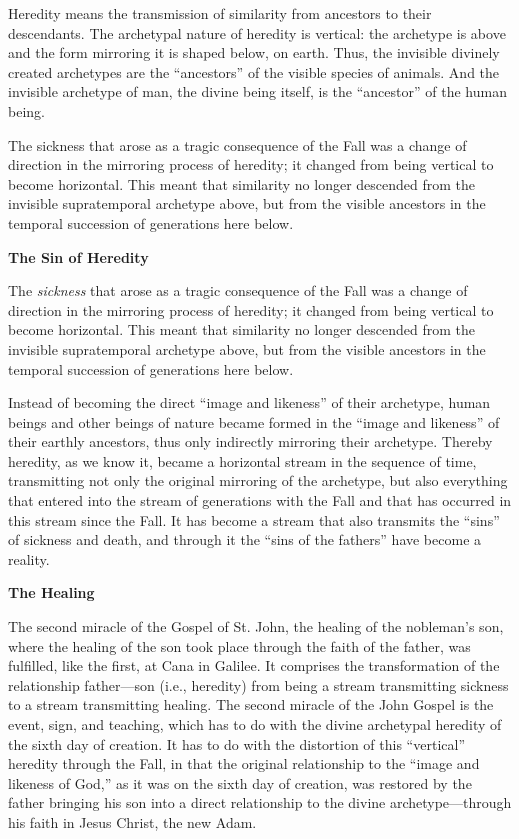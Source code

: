 Heredity means the transmission of similarity from ancestors to their descendants. The archetypal nature of heredity is vertical: the archetype is above and the form mirroring it is shaped below, on earth. Thus, the invisible divinely created archetypes are the ``ancestors'' of the visible species of animals. And the invisible archetype of man, the divine being itself, is the ``ancestor'' of the human being.

The sickness that arose as a tragic consequence of the Fall was a change of direction in the mirroring process of heredity; it changed from being vertical to become horizontal. This meant that similarity no longer descended from the invisible supratemporal archetype above, but from the visible ancestors in the temporal succession of generations here below.

\textbf{The Sin of Heredity}

The \emph{sickness} that arose as a tragic consequence of the Fall was a change of direction in the mirroring process of heredity; it changed from being vertical to become horizontal. This meant that similarity no longer descended from the invisible supratemporal archetype above, but from the visible ancestors in the temporal succession of generations here below.

Instead of becoming the direct ``image and likeness'' of their archetype, human beings and other beings of nature became formed in the ``image and likeness'' of their earthly ancestors, thus only indirectly mirroring their archetype. Thereby heredity, as we know it, became a horizontal stream in the sequence of time, transmitting not only the original mirroring of the archetype, but also everything that entered into the stream of generations with the Fall and that has occurred in this stream since the Fall. It has become a stream that also transmits the ``sins'' of sickness and death, and through it the ``sins of the fathers'' have become a reality.

\textbf{The Healing}

The second miracle of the Gospel of St. John, the healing of the nobleman's son, where the healing
of the son took place through the faith of the father, was fulfilled, like the first, at Cana in Galilee. It comprises the transformation of the relationship father—son (i.e., heredity) from being a stream transmitting sickness to a stream transmitting healing. The second miracle of the John Gospel is the event, sign, and teaching, which has to do with the divine archetypal heredity of the sixth day of creation. It has to do with the distortion of this ``vertical'' heredity through the Fall, in that the original relationship to the ``image and likeness of God,'' as it was on the sixth day of creation, was restored by the father bringing his son into a direct relationship to the divine archetype—through his faith in Jesus Christ, the new Adam.

